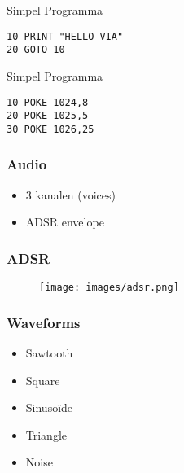 \documentclass[aspectratio=43]{uva-inf-presentation}
\begin{document}

\begin{frame}[fragile]{Simpel Programma}

\begin{lstlisting}
10 PRINT "HELLO VIA"
20 GOTO 10
\end{lstlisting}

\end{frame}


\begin{frame}[fragile]{Simpel Programma}

\begin{lstlisting}
10 POKE 1024,8
20 POKE 1025,5
30 POKE 1026,25
\end{lstlisting}

\end{frame}


\begin{frame}
\frametitle{Audio}

\begin{itemize}
\item 3 kanalen (voices)
\item ADSR envelope
\end{itemize}

\end{frame}



\begin{frame}
\frametitle{ADSR}

\begin{figure}
\texttt{[image: images/adsr.png]}
\end{figure}

\end{frame}


\begin{frame}
\frametitle{Waveforms}

\begin{itemize}
\item Sawtooth
\item Square
\item Sinuso\"ide
\item Triangle
\item Noise
\end{itemize}

\end{frame}
\end{document}
